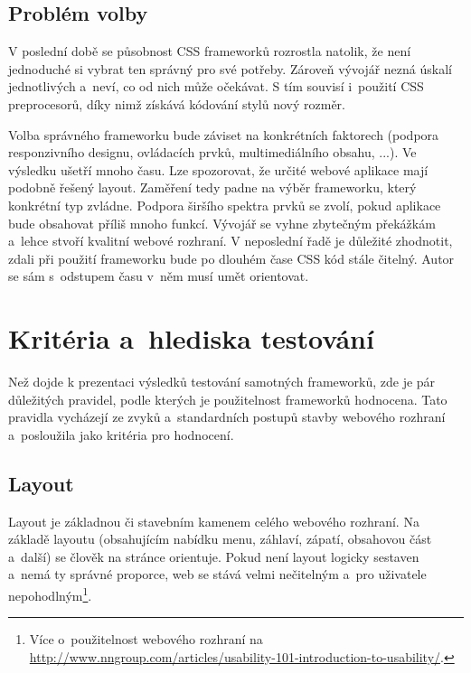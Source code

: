 \documentclass[thesis=B,czech]{FITthesis}[2012/06/26]
\begin{document}
\section{Problém volby}

V poslední době se působnost CSS frameworků rozrostla natolik, že není jednoduché si vybrat ten správný pro své potřeby. Zároveň vývojář nezná úskalí jednotlivých a~neví, co od nich může očekávat. S tím souvisí i~použití CSS preprocesorů, díky nimž získává kódování stylů nový rozměr. 

Volba správného frameworku bude záviset na konkrétních faktorech (podpora responzivního designu, ovládacích prvků, multimediálního obsahu, ...). Ve výsledku ušetří mnoho času. Lze spozorovat, že určité webové aplikace mají podobně řešený layout. Zaměření tedy padne na výběr frameworku, který konkrétní typ zvládne. Podpora širšího spektra prvků se zvolí, pokud aplikace bude obsahovat příliš mnoho funkcí. Vývojář se vyhne zbytečným překážkám a~lehce stvoří kvalitní webové rozhraní. V neposlední řadě je důležité zhodnotit, zdali při použití frameworku bude po dlouhém čase CSS kód stále čitelný. Autor se sám s~odstupem času v~něm musí umět orientovat.



\chapter{Kritéria a~hlediska testování}
\label{sec:hod}
Než dojde k prezentaci výsledků testování samotných frameworků, zde je pár důležitých pravidel, podle kterých je použitelnost frameworků hodnocena. Tato pravidla vycházejí ze zvyků a~standardních postupů stavby webového rozhraní a~posloužila jako kritéria pro hodnocení.



\section{Layout}



Layout je základnou či stavebním kamenem celého webového rozhraní. Na základě layoutu (obsahujícím nabídku menu, záhlaví, zápatí, obsahovou část a~další) se člověk na stránce orientuje. Pokud není layout logicky sestaven a~nemá ty správné proporce, web se stává velmi nečitelným a~pro uživatele nepohodlným\footnote{Více o~použitelnost webového rozhraní na \url{http://www.nngroup.com/articles/usability-101-introduction-to-usability/}.}.
\end{document}
